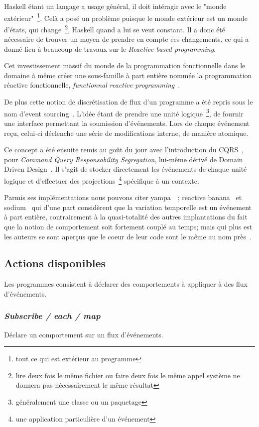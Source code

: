 \documentclass{article}
\begin{document}
Haskell étant un langage a usage général, il doit intéragir avec le "monde extérieur"~\footnote{tout ce qui est extérieur au programme}.
Celà a posé un problème puisque le monde extérieur est un monde d'états, qui change~\footnote{lire deux fois le même fichier ou faire deux fois le même appel système ne donnera pas nécessairement le même résultat},
Haskell quand a lui se veut constant.
Il a donc été nécessaire de trouver un moyen de prendre en compte ces changements,
ce qui a donné lieu à beaucoup de travaux sur le \emph{Reactive-based programming}.

Cet investissement massif du monde de la programmation fonctionnelle
dans le domaine à même créer une sous-famille à part entière nommée la
programmation réactive fonctionnelle, \emph{functionnal reactive programming}~\cite{frp}.

De plus cette notion de discrétisation de flux d'un programme a été repris
sous le nom d'event sourcing~\cite{eventsourcing}. 
L'idée étant de prendre une unité logique~\footnote{généralement une classe ou un paquetage},
de fournir une interface permettant la soumission d'événements. Lors de chaque événement
reçu, celui-ci déclenche une série de modifications interne, de manière atomique.

Ce concept a été ensuite remis au goût du jour avec l'introduction du CQRS~\cite{cqrs},
pour \emph{Command Query Responsability Segregation}, lui-même dérivé de
Domain Driven Design~\cite{ddd}.
Il s'agit de stocker directement les événements de chaque unité logique et d'effectuer
des projections~\footnote{une application particulière d'un événement} spécifique à un contexte.

Parmis ses implémentations nous pouvons citer yampa~\cite{yampa}~\cite{arrows};
reactive banana~\cite{reactivebanana} et sodium~\cite{sodium} qui d'une part considèrent que
la variation temporelle est un événement à part entière, contrairement à
la quasi-totalité des autres implantations du fait que la notion de
comportement soit fortement couplé au temps; mais qui plus est les
auteurs se sont aperçus que le coeur de leur code sont le même au nom
près~\cite{sodium_talk}.

\subsection{Actions disponibles}
Les programmes consistent à déclarer des comportements à appliquer à des flux
d'événements.

\subsubsection{\emph{Subscribe / each / map}}
Déclare un comportement sur un flux d'événements.
\end{document}
